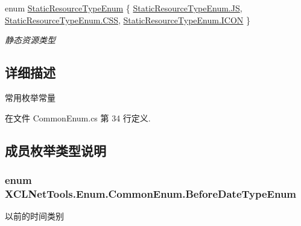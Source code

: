 \begin{DoxyCompactItemize}
enum \hyperlink{class_x_c_l_net_tools_1_1_enum_1_1_common_enum_abe6c6928080288df4a77ec8a59c537d1}{Static\-Resource\-Type\-Enum} \{ \hyperlink{class_x_c_l_net_tools_1_1_enum_1_1_common_enum_abe6c6928080288df4a77ec8a59c537d1a5bc06f5800d415cc95e1349edbaca425}{Static\-Resource\-Type\-Enum.\-J\-S}, 
\hyperlink{class_x_c_l_net_tools_1_1_enum_1_1_common_enum_abe6c6928080288df4a77ec8a59c537d1a2c56c360580420d293172f42d85dfbed}{Static\-Resource\-Type\-Enum.\-C\-S\-S}, 
\hyperlink{class_x_c_l_net_tools_1_1_enum_1_1_common_enum_abe6c6928080288df4a77ec8a59c537d1add912956b69fb3e570820021206968a3}{Static\-Resource\-Type\-Enum.\-I\-C\-O\-N}
 \}
\begin{DoxyCompactList}\small\item\em 静态资源类型 \end{DoxyCompactList}\end{DoxyCompactItemize}


\subsection{详细描述}
常用枚举常量 



在文件 Common\-Enum.\-cs 第 34 行定义.



\subsection{成员枚举类型说明}
\hypertarget{class_x_c_l_net_tools_1_1_enum_1_1_common_enum_abac0e863746b7fb8e6364c17f61648ea}{
\subsubsection[{Before\-Date\-Type\-Enum}]{\setlength{\rightskip}{0pt plus 5cm}enum {\bf X\-C\-L\-Net\-Tools.\-Enum.\-Common\-Enum.\-Before\-Date\-Type\-Enum}}}\label{class_x_c_l_net_tools_1_1_enum_1_1_common_enum_abac0e863746b7fb8e6364c17f61648ea}


以前的时间类别 

